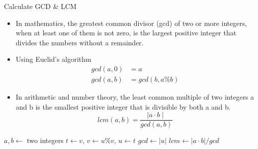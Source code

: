 \documentclass[10pt,t]{beamer}
\begin{document}
\begin{frame}[allowframebreaks]{Calculate GCD \& LCM}
  \begin{itemize}
  \item In mathematics, the greatest common divisor (gcd) of two or more integers, when at least one of them is not zero, is the largest positive integer that divides the numbers without a remainder.
  \item Using Euclid's algorithm
    \begin{align*}
      gcd(a,0) &= a \\
      gcd(a,b) &= gcd(b, a\% b)
    \end{align*}
  \item In arithmetic and number theory, the least common multiple of two integers a and b is the smallest positive integer that is divisible by both a and b.
    \begin{equation*}
      lcm(a,b) = \frac{\mid{}a\cdot{}b\mid}{gcd(a,b)}
    \end{equation*}
  \end{itemize}
  \begin{algorithm}[H]
    \caption{Pseudo Code to calculate gcd}
    \begin{algorithmic}
      \State $a,b \gets$ two integers
      \State $t\gets v$, $v\gets u\%v$, $u\gets t$
      \EndDo
      \State $gcd \gets |u|$
      \State $lcm \gets |a\cdot{}b|/gcd$
    \end{algorithmic}
  \end{algorithm}
  
\end{frame}
\end{document}

